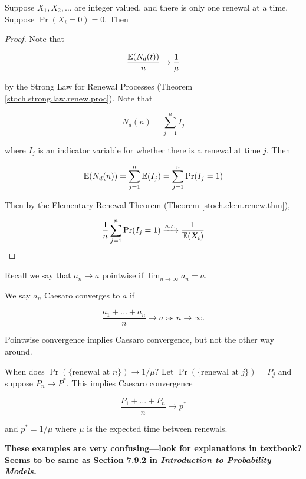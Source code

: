 \begin{proposition}
Suppose \(X_1, X_2, \ldots\) are integer valued, and there is only one renewal at a time. Suppose \(\Pr(X_i = 0) = 0\).  Then
\end{proposition}

\begin{proof}
Note that

\[
\frac{ \E(N_d(t))}{n} \to \frac{1}{\mu}
\]

by the Strong Law for Renewal Processes (Theorem \ref{stoch.strong.law.renew.proc}). Note that

\[
N_d(n) = \sum_{j=1}^n I_j
\]

where \(I_j\) is an indicator variable for whether there is a renewal at time \(j\). Then

\[
\E(N_d(n) ) = \sum_{j=1}^n \E( I_j) =  \sum_{j=1}^n \Pr(I_j = 1)
\]

Then by the Elementary Renewal Theorem (Theorem \ref{stoch.elem.renew.thm}),

\[
 \frac{1}{n} \sum_{j=1}^n \Pr(I_j = 1) \xrightarrow{a.s.} \frac{1}{\E(X_i)}
 \]
 

\end{proof}

Recall we say that \(a_n \to a\) pointwise if \(\lim_{n \to \infty} a_n = a\). 

\begin{definition} We say \(a_n\) Caesaro converges to \(a\) if 

\[
\frac{a_1 + \ldots + a_n}{n} \to a \text{ as } n \to \infty.
\]

\end{definition}

\begin{remark} Pointwise convergence implies Caesaro convergence, but not the other way around.
\end{remark}

When does \(\Pr(\{\text{renewal at } n\}) \to 1/\mu\)? Let \(\Pr(\{\text{renewal at } j\}) = P_j\) and suppose \(P_n \to P^*\). This implies Caesaro convergence

\[
\frac{P_1 + \ldots + P_n}{n} \to p^* 
\]

and \(p^* = 1/\mu\) where \(\mu\) is the expected time between renewals.

\textbf{These examples are very confusing---look for explanations in textbook? Seems to be same as Section 7.9.2 in \textit{Introduction to Probability Models}.}

